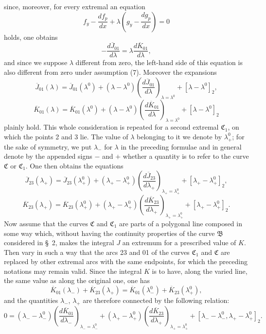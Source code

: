 \documentclass[11pt,a4paper,leqno]{article}
\begin{document}
since, moreover, for every extremal an equation
\[
f_y-\frac{df_p}{dx}+\lambda\left(g_y-\frac{dg_p}{dx}\right)=0
\]
holds, one obtains
\begin{equation}\tag{9}
-\frac{d\overline{J}_{01}}{d\lambda}=\lambda\frac{d\overline{K}_{01}}{d\lambda},
\end{equation}
and since we suppose $\lambda$ different from zero, the left-hand side of this equation is also different from zero under assumption (7). Moreover the expansions
\[
\overline{J}_{01}(\lambda)=\overline{J}_{01}(\lambda^0)+(\lambda-\lambda^0)\left(\frac{d\overline{J}_{01}}{d\lambda}\right)_{\lambda=\lambda^0}+[\lambda-\lambda^0]_2,
\]
\[
\overline{K}_{01}(\lambda)=\overline{K}_{01}(\lambda^0)+(\lambda-\lambda^0)\left(\frac{d\overline{K}_{01}}{d\lambda}\right)_{\lambda=\lambda^0}+[\lambda-\lambda^0]_2
\]
plainly hold. This whole consideration is repeated for a second extremal $\mathfrak{C}_1$, on which the points 2 and 3 lie. The value of $\lambda$ belonging to it we denote by $\lambda_+^0$; for the sake of symmetry, we put $\lambda_-$ for $\lambda$ in the preceding formulae and in general denote by the appended signs $-$ and $+$ whether a quantity is to refer to the curve $\mathfrak{C}$ or $\mathfrak{C}_1$. One then obtains the equations
\[
\overline{J}_{23}(\lambda_+)=\overline{J}_{23}(\lambda_+^0)+
(\lambda_+-\lambda_+^0)\left(\frac{d\overline{J}_{23}}{d\lambda_+}\right)_{\lambda_+=\lambda_+^0}
+[\lambda_+-\lambda_+^0]_2,
\]
\[
\overline{K}_{23}(\lambda_+)=\overline{K}_{23}(\lambda_+^0)+
(\lambda_+-\lambda_+^0)\left(\frac{d\overline{K}_{23}}{d\lambda_+}\right)_{\lambda_+=\lambda_+^0}
+[\lambda_+-\lambda_+^0]_2.
\]
Now assume that the curves $\mathfrak{C}$ and $\mathfrak{C}_1$ are parts of a polygonal line composed in some way which, without having the continuity properties of the curve $\mathfrak{B}$ considered in \S~2, makes the integral $J$ an extremum for a prescribed value of $K$. Then vary in such a way that the arcs 23 and 01 of the curves $\mathfrak{C}_1$ and $\mathfrak{C}$ are replaced by other extremal arcs with the same endpoints, for which the preceding notations may remain valid. Since the integral $K$ is to have, along the varied line, the same value as along the original one, one has
\[
\overline{K}_{01}(\lambda_-)+\overline{K}_{23}(\lambda_+)
=\overline{K}_{01}(\lambda_-^0)+\overline{K}_{23}(\lambda_+^0),
\]
and the quantities $\lambda_-$, $\lambda_+$ are therefore connected by the following relation:
\[
0=(\lambda_- -\lambda_-^0)\left(\frac{d\overline{K}_{01}}{d\lambda_-}\right)_{\lambda_- =\lambda_-^0}
+(\lambda_+ -\lambda_+^0)\left(\frac{d\overline{K}_{23}}{d\lambda_+}\right)_{\lambda_+ =\lambda_+^0}
+[\lambda_- -\lambda_-^0,\lambda_+ -\lambda_+^0]_2.
\]
\end{document}
